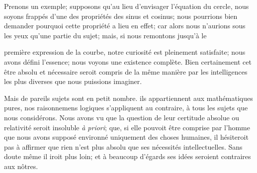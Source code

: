 \documentclass[11pt,a4paper]{article}
\begin{document}
Prenons un exemple; supposons qu'au lieu d'envisager l'équation du
cercle, nous soyons frappés d'une des propriétés des sinus et cosinus;
nous pourrions bien demander pourquoi cette propriété a lieu en effet;
car alors nous n'aurions sous les yeux qu'une partie du sujet; mais, si
nous remontons jusqu'à le

première expression de la courbe, notre curiosité est pleinement
satisfaite; nous avons défini l'essence; nous voyons une existence
complète. Bien certainement cet être absolu et nécessaire seroit compris
de la même manière par les intelligences les plus diverses que nous
puissions imaginer.

Mais de pareils sujets sont en petit nombre. ils appartiennent aux
mathématiques pures, nos raisonnemens logiques s'appliquent au contraire,
 à tous les sujets que nous considérons. Nous avons vu que la
question de leur certitude absolue ou relativité seroit insoluble
\emph{à priori}; que,  si elle pouvoit être comprise
par l'homme que nous avons supposé environné uniquement des choses
humaines, il hésiteroit pas à affirmer que rien n'est plus absolu que
\struck{\ill{}} ses nécessités intellectuelles. Sans doute même il iroit
plus loin;  et à beaucoup d'égards ses idées
seroient contraires aux nôtres.
\end{document}
